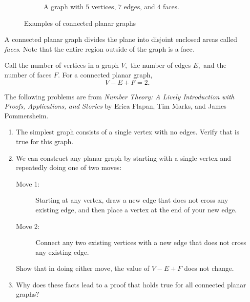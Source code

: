 \documentclass[letterpaper, 11 pt]{ximera}
\begin{document}
\begin{exploration}
\begin{figure}
\begin{subfigure}{0.3\textwidth}
\begin{center}
             \end{center}
            \caption{A graph with $5$ vertices, $7$ edges, and $4$ faces.}
        \end{subfigure}
        \caption{Examples of connected planar graphs}\label{fig:graphs}
    \end{figure}

A connected planar graph divides the plane into disjoint enclosed areas called \emph{faces}. Note that the entire region outside of the graph is a face.


\begin{theorem}\label{thm:euler-form}
	Call the number of vertices in a graph $V,$ the number of edges $E,$ and the number of faces $F.$ For a connected planar graph, \[V-E+F=2.\]
\end{theorem}

The following problems are from \emph{Number Theory: A Lively Introduction with Proofs, Applications, and Stories} by Erica Flapan, Tim Marks, and James Pommersheim.

\begin{problem}

	\begin{enumerate}
 		\item The simplest graph consists of a single vertex with no edges. Verify that  is true for this graph.
		\item We can construct any planar graph by starting with a single vertex and repeatedly doing one of two moves:
		\begin{description}
 			\item[Move 1:] Starting at any vertex, draw a new edge that does not cross any existing edge, and then place a vertex at the end of your new edge.
			\item[Move 2:] Connect any two existing vertices with a new edge that does not cross any existing edge.
		\end{description}
		Show that in doing either move, the value of $V-E+F$ does not change.
	
		\item Why does these facts lead to a proof that  holds true for all connected planar graphs?
	\end{enumerate}
 
\end{problem}	
\end{exploration}
\end{document}
